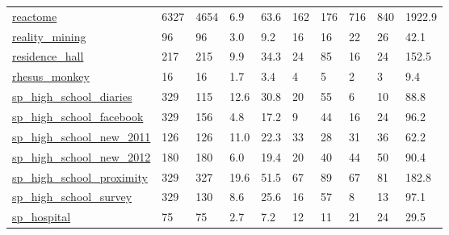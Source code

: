 \begin{longtable}{llllllllll}
 \href{http://konect.cc/networks/reactome}{reactome}                                                                        & 6327       & 4654  & 6.9    & 63.6   & 162   & 176    & 716    & 840    & 1922.9  \\
 \href{http://konect.cc/networks/mit}{reality\_mining}                                                                       & 96         & 96    & 3.0    & 9.2    & 16    & 16     & 22     & 26     & 42.1    \\
 \href{http://konect.cc/networks/moreno_oz}{residence\_hall}                                                                 & 217        & 215   & 9.9    & 34.3   & 24    & 85     & 16     & 24     & 152.5   \\
 \href{http://konect.cc/networks/moreno_rhesus}{rhesus\_monkey}                                                              & 16         & 16    & 1.7    & 3.4    & 4     & 5      & 2      & 3      & 9.4     \\
 \href{http://www.sociopatterns.org/datasets/high-school-contact-and-friendship-networks/}{sp\_high\_school\_diaries}          & 329        & 115   & 12.6   & 30.8   & 20    & 55     & 6      & 10     & 88.8    \\
 \href{http://www.sociopatterns.org/datasets/high-school-contact-and-friendship-networks/}{sp\_high\_school\_facebook}         & 329        & 156   & 4.8    & 17.2   & 9     & 44     & 16     & 24     & 96.2    \\
 \href{http://www.sociopatterns.org/datasets/high-school-dynamic-contact-networks/}{sp\_high\_school\_new\_2011}                & 126        & 126   & 11.0   & 22.3   & 33    & 28     & 31     & 36     & 62.2    \\
 \href{http://www.sociopatterns.org/datasets/high-school-dynamic-contact-networks/}{sp\_high\_school\_new\_2012}                & 180        & 180   & 6.0    & 19.4   & 20    & 40     & 44     & 50     & 90.4    \\
 \href{http://www.sociopatterns.org/datasets/high-school-contact-and-friendship-networks/}{sp\_high\_school\_proximity}        & 329        & 327   & 19.6   & 51.5   & 67    & 89     & 67     & 81     & 182.8   \\
 \href{http://www.sociopatterns.org/datasets/high-school-contact-and-friendship-networks/}{sp\_high\_school\_survey}           & 329        & 130   & 8.6    & 25.6   & 16    & 57     & 8      & 13     & 97.1    \\
 \href{http://www.sociopatterns.org/datasets/hospital-ward-dynamic-contact-network/}{sp\_hospital}                           & 75         & 75    & 2.7    & 7.2    & 12    & 11     & 21     & 24     & 29.5    \\

\end{longtable}
